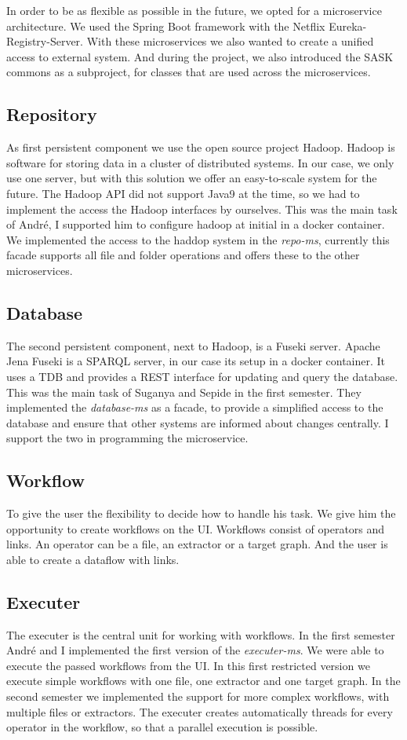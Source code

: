 In order to be as flexible as possible in the future, we opted for a microservice architecture. We used the Spring Boot framework with the Netflix Eureka-Registry-Server. With these microservices we also wanted to create a unified access to external system. And during the project, we also introduced the SASK commons as a subproject, for classes that are used across the microservices. 

\subsection{Repository}
As first persistent component we use the open source project Hadoop. Hadoop is software for storing data in a cluster of distributed systems. In our case, we only use one server, but with this solution we offer an easy-to-scale system for the future. The Hadoop API did not support Java9 at the time, so we had to implement the access the Hadoop interfaces by ourselves. This was the main task of André, I supported him to configure hadoop at initial in a docker container. We implemented the access to the haddop system in the \textit{repo-ms}, currently this facade supports all file and folder operations and offers these to the other microservices.

\subsection{Database}
The second persistent component, next to Hadoop, is a Fuseki server. Apache Jena Fuseki is a SPARQL server, in our case its setup in a docker container. It uses a TDB and provides a REST interface for updating and query the database. This was the main task of Suganya and Sepide in the first semester. They implemented the \textit{database-ms} as a facade, to provide a simplified access to the database and ensure that other systems are informed about changes centrally. I support the two in programming the microservice.

\subsection{Workflow}
To give the user the flexibility to decide how to handle his task. We give him the opportunity to create workflows on the UI. Workflows consist of operators and links. An operator can be a file, an extractor or a target graph. And the user is able to create a dataflow with links. 

\subsection{Executer}
The executer is the central unit for working with workflows. In the first semester André and I implemented the first version of the \textit{executer-ms}. We were able to execute the passed workflows from the UI. In this first restricted version we execute simple workflows with one file, one extractor and one target graph. In the second semester we implemented the support for more complex workflows, with multiple files or extractors. The executer creates automatically threads for every operator in the workflow, so that a parallel execution is possible.

